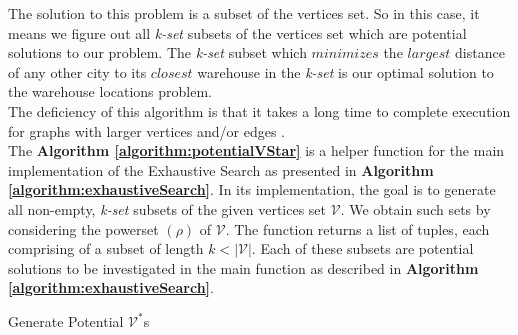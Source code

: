 \documentclass[longpaper, english, final, times]{revdetua}
\begin{document}
		The solution to this problem is a subset of the vertices set. So in this case, it means we figure out all \emph{k-set} subsets of the vertices set which are potential solutions to our problem. The \emph{k-set} subset which $minimizes$ the $largest$ distance of any other city to its $closest$ warehouse in the \emph{k-set}  is our optimal solution to the warehouse locations problem.\\
		
		The deficiency of this algorithm is that it takes a long time to complete execution for graphs with larger vertices and/or edges \cite{hui2010study}. \\
		
		The \textbf{Algorithm \ref{algorithm:potentialVStar}} is a helper function for the main implementation of the Exhaustive Search as presented in \textbf{Algorithm \ref{algorithm:exhaustiveSearch}}. In its implementation, the goal is to generate all non-empty, \emph{k-set} subsets of the given vertices set $\mathcal{V}$. We obtain such sets by considering the powerset $(\rho)$ of $\mathcal{V}$. The function returns a list of tuples, each comprising of a subset of length $k<|\mathcal{V}|$. Each of these subsets are potential solutions to be investigated in the main function as described in \textbf{Algorithm \ref{algorithm:exhaustiveSearch}}. \\
		
		\begin{algorithm}[!h]
			\caption{Generate Potential $\mathcal{V^{*}}$s}
			\label{algorithm:potentialVStar}
			\DontPrintSemicolon
			
			
			
		\end{algorithm}
		
\end{document}
